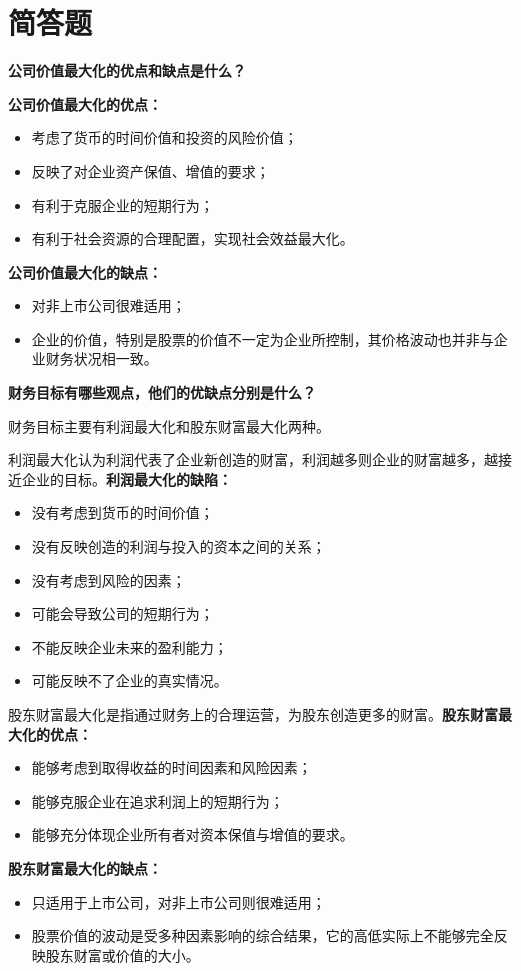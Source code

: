 \documentclass[
  10pt,
  twoside,
  openany,
  b5paper, %
  colorscheme = black, %
  xits = false,
]{qyxf-book}
\begin{document}
\section{简答题}
 \textbf{公司价值最大化的优点和缺点是什么？}
\begin{note}
	\textbf{公司价值最大化的优点：}
	\begin{itemize}
		\item 考虑了货币的时间价值和投资的风险价值；
		\item 反映了对企业资产保值、增值的要求；
		\item 有利于克服企业的短期行为；
		\item 有利于社会资源的合理配置，实现社会效益最大化。
	\end{itemize}
	\textbf{公司价值最大化的缺点：}
	\begin{itemize}
		\item 对非上市公司很难适用；
		\item 企业的价值，特别是股票的价值不一定为企业所控制，其价格波动也并非与企业财务状况相一致。
	\end{itemize}
	
\end{note}



 \textbf{财务目标有哪些观点，他们的优缺点分别是什么？}

\begin{note}
	财务目标主要有利润最大化和股东财富最大化两种。
	
	利润最大化认为利润代表了企业新创造的财富，利润越多则企业的财富越多，越接近企业的目标。\textbf{利润最大化的缺陷：}
	\begin{itemize}
		\item 没有考虑到货币的时间价值；
		\item 没有反映创造的利润与投入的资本之间的关系；
		\item 没有考虑到风险的因素；
		\item 可能会导致公司的短期行为；
		\item 不能反映企业未来的盈利能力；
		\item 可能反映不了企业的真实情况。
	\end{itemize}
	
	股东财富最大化是指通过财务上的合理运营，为股东创造更多的财富。\textbf{股东财富最大化的优点：}
	\begin{itemize}
		\item 能够考虑到取得收益的时间因素和风险因素；
		\item 能够克服企业在追求利润上的短期行为；
		\item 能够充分体现企业所有者对资本保值与增值的要求。
	\end{itemize}
	\textbf{股东财富最大化的缺点：}
	\begin{itemize}
		\item 只适用于上市公司，对非上市公司则很难适用；
		\item 股票价值的波动是受多种因素影响的综合结果，它的高低实际上不能够完全反映股东财富或价值的大小。
	\end{itemize}
\end{note}
\end{document}
